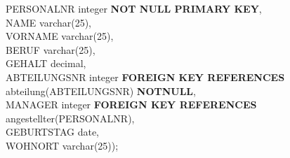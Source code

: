 \documentclass{article}
\begin{document}
				PERSONALNR integer \textbf{NOT NULL PRIMARY KEY},\\
				
				NAME varchar(25),\\
				
				VORNAME varchar(25),\\
				
				BERUF varchar(25),\\
				
				GEHALT decimal,\\
				
				ABTEILUNGSNR integer \textbf{FOREIGN KEY REFERENCES} abteilung(ABTEILUNGSNR) \textbf{NOTNULL},\\
				
				MANAGER integer \textbf{FOREIGN KEY REFERENCES} angestellter(PERSONALNR),\\
				
				GEBURTSTAG date,\\
				
				WOHNORT varchar(25));
			
			
\end{document}
